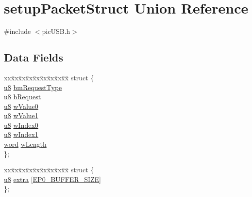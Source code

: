 \hypertarget{unionsetup_packet_struct}{\section{setup\-Packet\-Struct Union Reference}
\label{unionsetup_packet_struct}
}


{\ttfamily \#include $<$pic\-U\-S\-B.\-h$>$}

\subsection*{Data Fields}
\begin{DoxyCompactItemize}
\item 
\begin{tabbing}
xx\=xx\=xx\=xx\=xx\=xx\=xx\=xx\=xx\=\kill
struct \{\\
\>\hyperlink{p8_2pinguino_2core_2typedef_8h_aed742c436da53c1080638ce6ef7d13de}{u8} \hyperlink{unionsetup_packet_struct_a9119649a830686614e70e2e8d42c91d3}{bmRequestType}\\
\>\hyperlink{p8_2pinguino_2core_2typedef_8h_aed742c436da53c1080638ce6ef7d13de}{u8} \hyperlink{unionsetup_packet_struct_af819cb33a956603d06237735e0a40606}{bRequest}\\
\>\hyperlink{p8_2pinguino_2core_2typedef_8h_aed742c436da53c1080638ce6ef7d13de}{u8} \hyperlink{unionsetup_packet_struct_a9ec22823f856325394796ecddc8c7cee}{wValue0}\\
\>\hyperlink{p8_2pinguino_2core_2typedef_8h_aed742c436da53c1080638ce6ef7d13de}{u8} \hyperlink{unionsetup_packet_struct_ae02c3c2f43b18232e17336ffe81c72ea}{wValue1}\\
\>\hyperlink{p8_2pinguino_2core_2typedef_8h_aed742c436da53c1080638ce6ef7d13de}{u8} \hyperlink{unionsetup_packet_struct_a91b8fd70af5ded5499b717e76e57ebdd}{wIndex0}\\
\>\hyperlink{p8_2pinguino_2core_2typedef_8h_aed742c436da53c1080638ce6ef7d13de}{u8} \hyperlink{unionsetup_packet_struct_a69c3e2cd9dcf0b1d30b341f54296315a}{wIndex1}\\
\>\hyperlink{p8_2pinguino_2core_2typedef_8h_abad51e07ab6d26bec9f1f786c8d65bcd}{word} \hyperlink{unionsetup_packet_struct_a9fafd313816c51f76e621935f33a634a}{wLength}\\
\}; \\

\end{tabbing}\item 
\begin{tabbing}
xx\=xx\=xx\=xx\=xx\=xx\=xx\=xx\=xx\=\kill
struct \{\\
\>\hyperlink{p8_2pinguino_2core_2typedef_8h_aed742c436da53c1080638ce6ef7d13de}{u8} \hyperlink{unionsetup_packet_struct_a58bb89e8bf49d6ad691b92c4f9259933}{extra} \mbox{[}\hyperlink{pic_u_s_b_8h_a6f14b739a5aa3c5fe517de514f1ec7e2}{EP0\_BUFFER\_SIZE}\mbox{]}\\
\}; \\

\end{tabbing}\end{DoxyCompactItemize}


